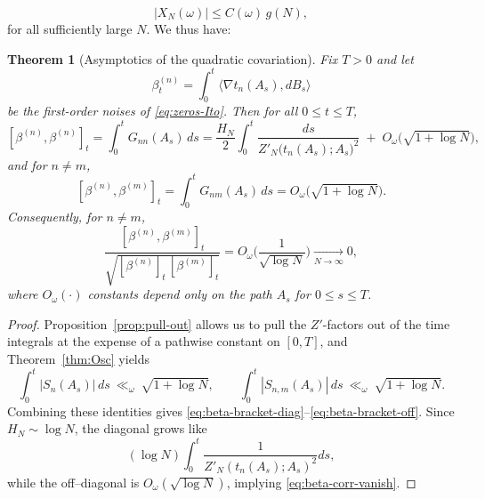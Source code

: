 \documentclass[12pt,reqno]{amsart}
\theoremstyle{plain}
\newtheorem{theorem}{Theorem}[section]
\theoremstyle{definition}
\theoremstyle{remark}
\begin{document}
\begin{equation}
|X_N(\omega)| \le C(\omega)\, g(N),
\end{equation}
for all sufficiently large $N$. We thus have:
\begin{theorem}[Asymptotics of the quadratic covariation]\label{prop:beta-bracket-asympt}
Fix $T>0$ and let 
\begin{equation}
\beta^{(n)}_t=\int_0^t\langle\nabla t_n(A_s),dB_s\rangle
\end{equation} be the first-order noises of \eqref{eq:zeros-Ito}.  
Then for all $0\le t\le T$,
\begin{equation}\label{eq:beta-bracket-diag}
[\beta^{(n)},\beta^{(n)}]_t
=\int_0^t G_{nn}(A_s)\,ds
=\frac{H_N}{2}\int_0^t \frac{ds}{Z'_N\!\bigl(t_n(A_s);A_s\bigr)^2}
\;+\;O_\omega\!\big(\sqrt{1+\log N}\big),
\end{equation}
and for $n\neq m$,
\begin{equation}\label{eq:beta-bracket-off}
[\beta^{(n)},\beta^{(m)}]_t
=\int_0^t G_{nm}(A_s)\,ds
=O_\omega\!\big(\sqrt{1+\log N}\big).
\end{equation}
Consequently, for $n \neq m$, 
\begin{equation}\label{eq:beta-corr-vanish}
\frac{[\beta^{(n)},\beta^{(m)}]_t}
{\sqrt{[\beta^{(n)}]_t\, [\beta^{(m)}]_t}}
=O_\omega\!\Big(\frac{1}{\sqrt{\log N}}\Big)\xrightarrow[N\to\infty]{}0,
\end{equation}
where $O_\omega(\cdot)$ constants
depend only on the path $A_s$ for $0\le s\le T$. 
\end{theorem}


\begin{proof}

Proposition~\ref{prop:pull-out} allows us to pull the $Z'$-factors out of the time
integrals at the expense of a pathwise constant on $[0,T]$, and
Theorem~\ref{thm:Osc} yields
\begin{equation}
\int_0^t |S_n(A_s)|\,ds\ \ll_\omega\ \sqrt{1+\log N},\qquad
\int_0^t |S_{n,m}(A_s)|\,ds\ \ll_\omega\ \sqrt{1+\log N}.
\end{equation}
Combining these identities gives \eqref{eq:beta-bracket-diag}–\eqref{eq:beta-bracket-off}.
Since $H_N\sim\log N$, the diagonal grows like 
\begin{equation}
(\log N)\int_0^t 
\frac{1}{Z'_N(t_n(A_s);A_s)^{2}}ds,
\end{equation}
while the off–diagonal is $O_\omega(\sqrt{\log N})$, implying
\eqref{eq:beta-corr-vanish}.
\end{proof}
\end{document}
